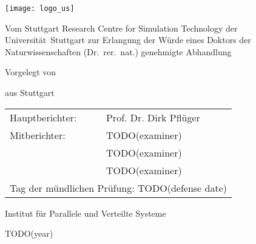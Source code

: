 
\begin{titlepage}
  \begin{spacing}{1}
    \begin{center}
      \begin{otherlanguage}{ngerman}
        \setlength{\parindent}{0pt}
        
        \texttt{[image: logo\_us]}
        
        \vfill
        
        {\textbf{\LARGE\thetitle}\par}
        
        \vfill
        
        Vom Stuttgart Research Centre for Simulation Technology der\\
        Universität~Stuttgart zur Erlangung der Würde eines Doktors der\\
        Naturwissenschaften (Dr.~rer.~nat.) genehmigte Abhandlung
        
        \vfill
        
        Vorgelegt von
        
        \vspace{1mm}
        
        \textbf{\large\theauthor}
        
        aus Stuttgart
        
        \vfill
        
        \begin{tabular}{ll}
          Hauptberichter:&
          Prof. Dr. Dirk Pflüger\\[0.5em]
          Mitberichter:&
          TODO(examiner)\\
          &TODO(examiner)\\
          &TODO(examiner)\\[1em]
          \multicolumn{2}{l}{%
            Tag der mündlichen Prüfung:\quad
            TODO(defense date)%
          }
        \end{tabular}
        
        \vfill
        
        Institut für Parallele und Verteilte Systeme
        
        \vspace{5mm}
        
        TODO(year)
      \end{otherlanguage}
    \end{center}
  \end{spacing}
\end{titlepage}

